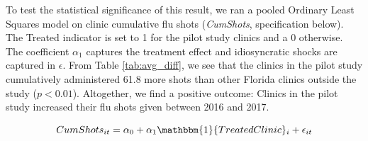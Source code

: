 To test the statistical significance of this result, we ran a pooled Ordinary Least Squares model on clinic cumulative flu shots (\textit{CumShots}, specification below). The Treated indicator is set to 1 for the pilot study clinics and a 0 otherwise. The coefficient $\alpha_1$ captures the treatment effect and idiosyncratic shocks are captured in $\epsilon$. From Table \ref{tab:avg_diff}, we see that the clinics in the pilot study cumulatively administered 61.8 more shots than other Florida clinics outside the study ($p < 0.01$). Altogether, we find a positive outcome: Clinics in the pilot study increased their flu shots given between 2016 and 2017.

 \begin{table}
 \end{table}

 \begin{equation} %
       CumShots_{it} = \alpha_0 + \alpha_1 \mathbbm{1}\{TreatedClinic\}_{i} + \epsilon_{it}
 \end{equation} 

